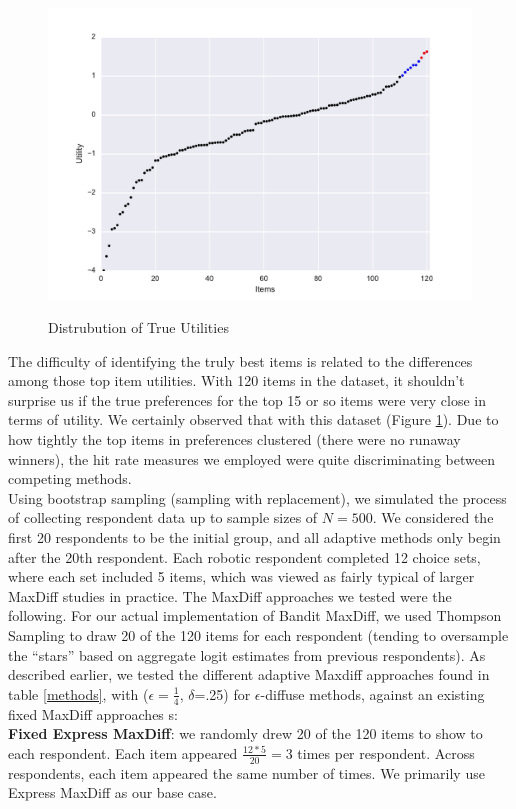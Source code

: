 \documentclass[nonblindrev]{informs3}
\begin{document}
\begin{figure}[!ht]
\caption{Distrubution of True Utilities}
\includegraphics[width=1\textwidth]{plots/utilscore.pdf}
\label{fig:util}
\end{figure}
The difficulty of identifying the truly best items is related to the differences among those top item utilities. With 120 items in the dataset, it shouldn't surprise us if the true preferences for the top 15 or so items were very close in terms of utility.  We certainly observed that with this dataset (Figure \ref{fig:util}).  Due to how tightly the top items in preferences clustered (there were no runaway winners), the hit rate measures we employed were quite discriminating between competing methods.\\
Using bootstrap sampling (sampling with replacement), we simulated the process of collecting respondent data up to sample sizes of $N=500$.  We considered the first 20 respondents to be the initial group, and all adaptive methods only begin after the 20th respondent. Each robotic respondent completed 12 choice sets, where each set included 5 items, which was viewed as fairly typical of larger MaxDiff studies in practice.
The MaxDiff approaches we tested were the following. For our actual implementation of Bandit MaxDiff, we used Thompson Sampling to draw 20 of the 120 items for each respondent (tending to oversample the ``stars'' based on aggregate logit estimates from previous respondents).  As described earlier, we tested the different adaptive Maxdiff approaches found in table \ref{methods}, with ($\epsilon=\frac{1}{4}$, $\delta$=.25) for $\epsilon$-diffuse methods, against an existing fixed MaxDiff approaches s:\\
\textbf{Fixed Express MaxDiff}: we randomly drew 20 of the 120 items to show to each respondent.  Each item appeared $\frac{12*5}{20} = 3$ times per respondent.  Across respondents, each item appeared the same number of times. We primarily use Express MaxDiff as our base case.\\
\end{document}
